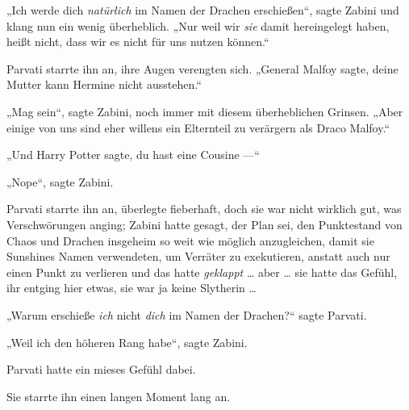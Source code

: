 „Ich werde dich \emph{natürlich} im Namen der Drachen erschießen“, sagte Zabini und klang nun ein wenig überheblich.
„Nur weil wir \emph{sie} damit hereingelegt haben, heißt nicht, dass wir es nicht für uns nutzen können.“

Parvati starrte ihn an, ihre Augen verengten sich.
„General Malfoy sagte, deine Mutter kann Hermine nicht ausstehen.“

„Mag sein“, sagte Zabini, noch immer mit diesem überheblichen Grinsen.
„Aber einige von uns sind eher willens ein Elternteil zu verärgern als Draco Malfoy.“

„Und Harry Potter sagte, du hast eine Cousine —“

„Nope“, sagte Zabini.

Parvati starrte ihn an, überlegte fieberhaft, doch sie war nicht wirklich gut, was Verschwörungen anging; Zabini hatte gesagt, der Plan sei, den Punktestand von Chaos und Drachen insgeheim so weit wie möglich anzugleichen, damit sie Sunshines Namen verwendeten, um Verräter zu exekutieren, anstatt auch nur einen Punkt zu verlieren und das hatte \emph{geklappt} … aber … sie hatte das Gefühl, ihr entging hier etwas, sie war ja keine Slytherin …

„Warum erschieße \emph{ich} nicht \emph{dich} im Namen der Drachen?“ sagte Parvati.

„Weil ich den höheren Rang habe“, sagte Zabini.

Parvati hatte ein mieses Gefühl dabei.

Sie starrte ihn einen langen Moment lang an.

